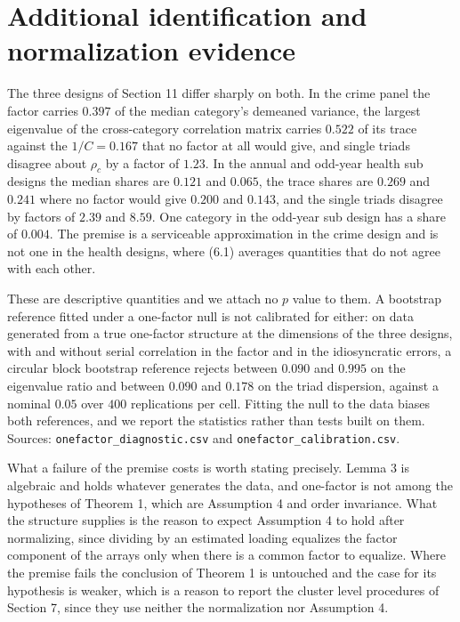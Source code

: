 \documentclass[12pt]{article}
\theoremstyle{definition}
\numberwithin{equation}{section}
\begin{document}
\section{Additional identification and normalization evidence}

The three designs of Section 11 differ sharply on both. In the crime
panel the factor carries $0.397$ of the median category's demeaned variance, the
largest eigenvalue of the cross-category correlation matrix carries $0.522$ of
its trace against the $1/C = 0.167$ that no factor at all would give, and single
triads disagree about $\rho_c$ by a factor of $1.23$. In the annual and odd-year health sub designs the median shares are $0.121$ and $0.065$, the trace shares
are $0.269$ and $0.241$ where no factor would give $0.200$ and $0.143$, and the
single triads disagree by factors of $2.39$ and $8.59$. One category in the odd-year sub design has a share of $0.004$. The premise is a serviceable
approximation in the crime design and is not one in the health designs, where
(6.1) averages quantities that do not agree with each other.

These are descriptive quantities and we attach no $p$ value to them. A bootstrap
reference fitted under a one-factor null is not calibrated for either: on data
generated from a true one-factor structure at the dimensions of the three
designs, with and without serial correlation in the factor and in the
idiosyncratic errors, a circular block bootstrap reference rejects between
$0.090$ and $0.995$ on the eigenvalue ratio and between $0.090$ and $0.178$ on
the triad dispersion, against a nominal $0.05$ over $400$ replications per cell.
Fitting the null to the data biases both references, and we report the
statistics rather than tests built on them. Sources:
\texttt{onefactor\_diagnostic.csv} and \texttt{onefactor\_calibration.csv}.

What a failure of the premise costs is worth stating precisely. Lemma
3 is algebraic and holds whatever generates the data, and one-factor is not among the hypotheses of Theorem 1, which are
Assumption 4 and order invariance. What the structure supplies is the
reason to expect Assumption 4 to hold after normalizing, since
dividing by an estimated loading equalizes the factor component of the arrays
only when there is a common factor to equalize. Where the premise fails the
conclusion of Theorem 1 is untouched and the case for its
hypothesis is weaker, which is a reason to report the cluster level procedures
of Section 7, since they use neither the normalization nor
Assumption 4.
\end{document}

